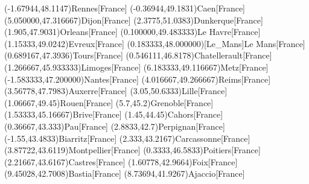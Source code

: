 \mapputIIID[90](-1.67944,48.1147){Rennes}[France]
\mapputIIID[-90](-0.36944,49.1831){Caen}[France]
\mapputIIID[90](5.050000,47.316667){Dijon}[France]
\mapputIIID[30](2.3775,51.0383){Dunkerque}[France]
\mapputIIID[90](1.905,47.9031){Orleans}[France]
\mapputIIID[180](0.100000,49.483333){Le Havre}[France]
\mapputIIID[90](1.15333,49.0242){Evreux}[France]
\mapputIIID[90](0.183333,48.000000)[Le_Mans]{Le Mans}[France]
\mapputIIID[90](0.689167,47.3936){Tours}[France]
\mapputIIID[90](0.546111,46.8178){Chatellerault}[France]
\mapputIIID[90](1.266667,45.933333){Limoges}[France]
\mapputIIID[90](6.183333,49.116667){Metz}[France]
\mapputIIID[90](-1.583333,47.200000){Nantes}[France]
\mapputIIID[90](4.016667,49.266667){Reims}[France]
\mapputIIID[30](3.56778,47.7983){Auxerre}[France]
\mapputIIID[90](3.05,50.6333){Lille}[France]
\mapputIIID[90](1.06667,49.45){Rouen}[France]
\mapputIIID[90](5.7,45.2){Grenoble}[France]
\mapputIIID[90](1.53333,45.16667){Brive}[France]
\mapputIIID[90](1.45,44.45){Cahors}[France]
\mapputIIID[90](0.36667,43.333){Pau}[France]
\mapputIIID[90](2.8833,42.7){Perpignan}[France]
\mapputIIID[90](-1.55,43.4833){Biarritz}[France]
\mapputIIID[90](2.333,43.2167){Carcassonne}[France]
\mapputIIID[90](3.87722,43.6119){Montpellier}[France]
\mapputIIID[90](0.3333,46.5833){Poitiers}[France]
\mapputIIID[0](2.21667,43.6167){Castres}[France]
\mapputIIID[90](1.60778,42.9664){Foix}[France]
\mapputIIID[90](9.45028,42.7008){Bastia}[France]
\mapputIIID[90](8.73694,41.9267){Ajaccio}[France]
